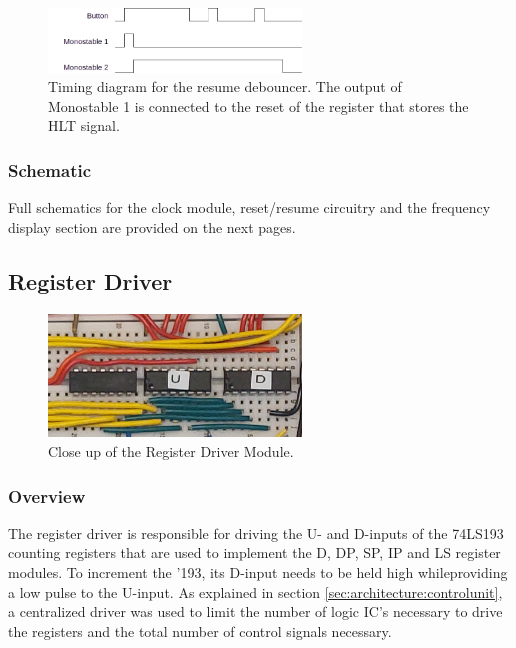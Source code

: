 \begin{figure}[H]
  \centering
  \includegraphics[width=0.6\textwidth]{img/resumedebounce}
  \caption{Timing diagram for the resume debouncer. The output of Monostable 1 is connected to the reset of the register that stores the HLT signal.}
  \label{fig:resumedebounce}
\end{figure}


\subsubsection{Schematic}
Full schematics for the clock module, reset/resume circuitry and the frequency display section are provided on the next pages.




\subsection{Register Driver} \label{sec:implementation:registerdriver}
\begin{figure}[H]
  \centering
  \includegraphics[width=0.6\textwidth]{img/registerdrivercloseup}
  \caption{Close up of the Register Driver Module.}
  \label{fig:registerdrivercloseup}
\end{figure}

\subsubsection{Overview}
The register driver is responsible for driving the U- and D-inputs of the 74LS193 counting registers that are used to implement the D, DP, SP, IP and LS register modules. To increment the '193, its D-input needs to be held high whileproviding a low pulse to the U-input. As explained in section \ref{sec:architecture:controlunit}, a centralized driver was used to limit the number of logic IC's necessary to drive the registers and the total number of control signals necessary.

